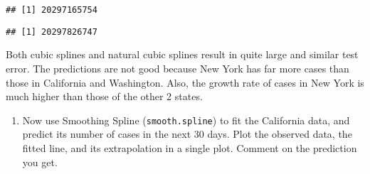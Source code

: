 \documentclass[]{article}
\newenvironment{Shaded}{\begin{snugshade}}{\end{snugshade}}
\newcommand{\CommentTok}[1]{\textcolor[rgb]{0.56,0.35,0.01}{\textit{#1}}}
\newcommand{\DataTypeTok}[1]{\textcolor[rgb]{0.13,0.29,0.53}{#1}}
\newcommand{\DecValTok}[1]{\textcolor[rgb]{0.00,0.00,0.81}{#1}}
\newcommand{\KeywordTok}[1]{\textcolor[rgb]{0.13,0.29,0.53}{\textbf{#1}}}
\newcommand{\NormalTok}[1]{#1}
\newcommand{\OperatorTok}[1]{\textcolor[rgb]{0.81,0.36,0.00}{\textbf{#1}}}
\newcommand{\StringTok}[1]{\textcolor[rgb]{0.31,0.60,0.02}{#1}}
\providecommand{\tightlist}{%
  \setlength{\itemsep}{0pt}\setlength{\parskip}{0pt}}
\begin{document}
\begin{verbatim}
## [1] 20297165754
\end{verbatim}

\begin{Shaded}
\end{Shaded}

\begin{verbatim}
## [1] 20297826747
\end{verbatim}

Both cubic splines and natural cubic splines result in quite large and
similar test error. The predictions are not good because New York has
far more cases than those in California and Washington. Also, the growth
rate of cases in New York is much higher than those of the other 2
states.

\begin{enumerate}
\def\labelenumi{(\alph{enumi})}
\setcounter{enumi}{4}
\tightlist
\item
  Now use Smoothing Spline (\texttt{smooth.spline}) to fit the
  California data, and predict its number of cases in the next 30 days.
  Plot the observed data, the fitted line, and its extrapolation in a
  single plot. Comment on the prediction you get.
\end{enumerate}
\end{document}
